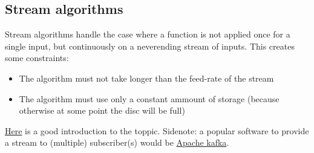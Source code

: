 \subsection{Stream algorithms}
Stream algorithms handle the case where a function is not applied once for a single input, but continuously on a neverending stream of inputs. This creates some constraints: 
\begin{itemize}
  \item The algorithm must not take longer than the feed-rate of the stream
  \item The algorithm must use only a constant ammount of storage (because otherwise at some point the disc will be full)
\end{itemize}
\href{https://www.americanscientist.org/article/the-britney-spears-problem}{Here} is a good introduction to the toppic. 
Sidenote: a popular software to provide a stream to (multiple) subscriber(s) would be \href{https://kafka.apache.org/}{Apache kafka}.